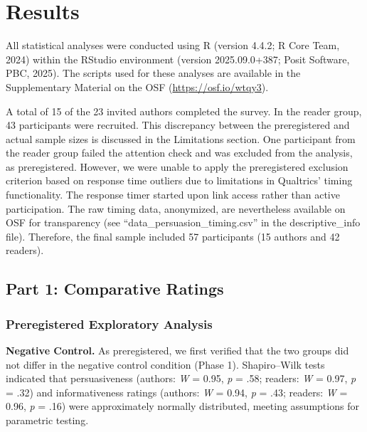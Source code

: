 \documentclass[authordate, meta]{jote-new-article}
\begin{document}
	\section{Results}



	All statistical analyses were conducted using R (version 4.4.2; R Core Team, 2024) within the RStudio environment (version 2025.09.0+387; Posit Software, PBC, 2025). The scripts used for these analyses are available in the Supplementary Material on the OSF (\url{https://osf.io/wtqy3}).



	A total of 15 of the 23 invited authors completed the survey. In the reader group, 43 participants were recruited. This discrepancy between the preregistered and actual sample sizes is discussed in the Limitations section. One participant from the reader group failed the attention check and was excluded from the analysis, as preregistered. However, we were unable to apply the preregistered exclusion criterion based on response time outliers due to limitations in Qualtrics' timing functionality. The response timer started upon link access rather than active participation. The raw timing data, anonymized, are nevertheless available on OSF for transparency (see “data\_persuasion\_timing.csv” in the descriptive\_info file). Therefore, the final sample included 57 participants (15 authors and 42 readers).



	\subsection{Part 1: Comparative Ratings}



	\subsubsection{Preregistered Exploratory Analysis}



	\textbf{Negative Control. }As preregistered, we first verified that the two groups did not differ in the negative control condition (Phase 1). Shapiro--Wilk tests indicated that persuasiveness (authors: \emph{W} = 0.95, \emph{p} = .58; readers: \emph{W} = 0.97, \emph{p} = .32) and informativeness ratings (authors: \emph{W} = 0.94, \emph{p} = .43; readers: \emph{W} = 0.96, \emph{p} = .16) were approximately normally distributed, meeting assumptions for parametric testing.
\end{document}
